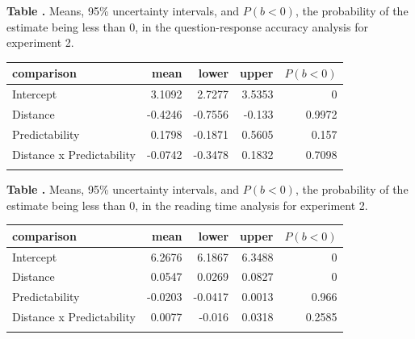 \documentclass{frontiersSCNS}\usepackage{knitr} %
\begin{document}
\begin{table}[!htbp]
\textbf{\label{Tab:02q} Table . }{Means, 95\% uncertainty intervals, and $P(b<0)$, the probability of the estimate being less than 0, in the question-response accuracy analysis for experiment 2.}
\processtable{}
{\begin{tabular}{lrrrr}\toprule
comparison & mean & lower & upper & $P(b<0)$ \\
\midrule   
Intercept  & 3.1092 & 2.7277 & 3.5353 & 0\\
Distance  & -0.4246 & -0.7556 & -0.133 & 0.9972\\
Predictability  & 0.1798 & -0.1871 & 0.5605 & 0.157\\
Distance x Predictability  & -0.0742 & -0.3478 & 0.1832 & 0.7098\\
\botrule
\end{tabular}}{}
\end{table}




\begin{table}[!htbp]
\textbf{\label{Tab:02} Table . }{Means, 95\% uncertainty intervals, and $P(b<0)$, the probability of the estimate being less than 0, in the reading time analysis for experiment 2.}
\processtable{}
{\begin{tabular}{lrrrr}\toprule
comparison & mean & lower & upper & $P(b<0)$ \\
\midrule   
Intercept  & 6.2676 & 6.1867 & 6.3488 & 0\\
Distance  & 0.0547 & 0.0269 & 0.0827 & 0\\
Predictability  & -0.0203 & -0.0417 & 0.0013 & 0.966\\
Distance x Predictability  & 0.0077 & -0.016 & 0.0318 & 0.2585\\
\botrule
\end{tabular}}{}
\end{table}
\end{document}
